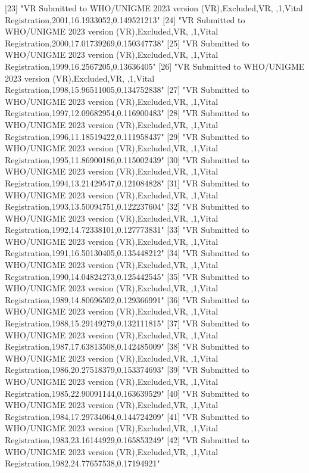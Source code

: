  [23] "VR Submitted to WHO/UNIGME 2023 version (VR),Excluded,VR, ,1,Vital Registration,2001,16.1933052,0.149521213"                  
 [24] "VR Submitted to WHO/UNIGME 2023 version (VR),Excluded,VR, ,1,Vital Registration,2000,17.01739269,0.150347738"                 
 [25] "VR Submitted to WHO/UNIGME 2023 version (VR),Excluded,VR, ,1,Vital Registration,1999,16.2567205,0.13636405"                   
 [26] "VR Submitted to WHO/UNIGME 2023 version (VR),Excluded,VR, ,1,Vital Registration,1998,15.96511005,0.134752838"                 
 [27] "VR Submitted to WHO/UNIGME 2023 version (VR),Excluded,VR, ,1,Vital Registration,1997,12.09682954,0.116900483"                 
 [28] "VR Submitted to WHO/UNIGME 2023 version (VR),Excluded,VR, ,1,Vital Registration,1996,11.18519422,0.111958437"                 
 [29] "VR Submitted to WHO/UNIGME 2023 version (VR),Excluded,VR, ,1,Vital Registration,1995,11.86900186,0.115002439"                 
 [30] "VR Submitted to WHO/UNIGME 2023 version (VR),Excluded,VR, ,1,Vital Registration,1994,13.21429547,0.121084828"                 
 [31] "VR Submitted to WHO/UNIGME 2023 version (VR),Excluded,VR, ,1,Vital Registration,1993,13.50094751,0.122237604"                 
 [32] "VR Submitted to WHO/UNIGME 2023 version (VR),Excluded,VR, ,1,Vital Registration,1992,14.72338101,0.127773831"                 
 [33] "VR Submitted to WHO/UNIGME 2023 version (VR),Excluded,VR, ,1,Vital Registration,1991,16.50130405,0.135448212"                 
 [34] "VR Submitted to WHO/UNIGME 2023 version (VR),Excluded,VR, ,1,Vital Registration,1990,14.04824273,0.125442545"                 
 [35] "VR Submitted to WHO/UNIGME 2023 version (VR),Excluded,VR, ,1,Vital Registration,1989,14.80696502,0.129366991"                 
 [36] "VR Submitted to WHO/UNIGME 2023 version (VR),Excluded,VR, ,1,Vital Registration,1988,15.29149279,0.132111815"                 
 [37] "VR Submitted to WHO/UNIGME 2023 version (VR),Excluded,VR, ,1,Vital Registration,1987,17.63813508,0.142485009"                 
 [38] "VR Submitted to WHO/UNIGME 2023 version (VR),Excluded,VR, ,1,Vital Registration,1986,20.27518379,0.153374693"                 
 [39] "VR Submitted to WHO/UNIGME 2023 version (VR),Excluded,VR, ,1,Vital Registration,1985,22.90091144,0.163639529"                 
 [40] "VR Submitted to WHO/UNIGME 2023 version (VR),Excluded,VR, ,1,Vital Registration,1984,17.29734064,0.144724209"                 
 [41] "VR Submitted to WHO/UNIGME 2023 version (VR),Excluded,VR, ,1,Vital Registration,1983,23.16144929,0.165853249"                 
 [42] "VR Submitted to WHO/UNIGME 2023 version (VR),Excluded,VR, ,1,Vital Registration,1982,24.77657538,0.17194921"                  
